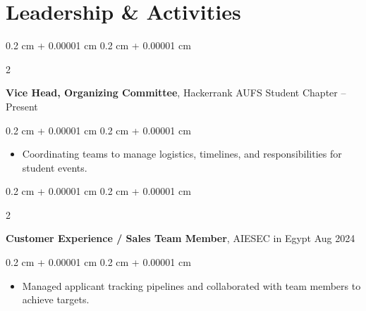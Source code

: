 \documentclass[10pt, letterpaper]{article}
\newenvironment{highlights}{
    \begin{itemize}[
        topsep=0.10 cm,
        parsep=0.10 cm,
        partopsep=0pt,
        itemsep=0pt,
        leftmargin=0.4 cm + 10pt
    ]
}{
    \end{itemize}
} %
\newenvironment{onecolentry}{
    \begin{adjustwidth}{
        0.2 cm + 0.00001 cm
    }{
        0.2 cm + 0.00001 cm
    }
}{
    \end{adjustwidth}
} %
\newenvironment{twocolentry}[2][]{
    \onecolentry
    \def\secondColumn{#2}
    \setcolumnwidth{\fill, 4.5 cm}
    \begin{paracol}{2}
}{
    \switchcolumn \raggedleft \secondColumn
    \end{paracol}
    \endonecolentry
} %
\begin{document}
    \section{Leadership \& Activities}

        \begin{twocolentry}{
            2025 – Present
        }
            \textbf{Vice Head, Organizing Committee}, Hackerrank AUFS Student Chapter\end{twocolentry}
        \vspace{0.10 cm}
        \begin{onecolentry}
            \begin{highlights}
                \item Coordinating teams to manage logistics, timelines, and responsibilities for student events.
            \end{highlights}
        \end{onecolentry}

        \vspace{0.2 cm}

        \begin{twocolentry}{
            Aug 2024
        }
            \textbf{Customer Experience / Sales Team Member}, AIESEC in Egypt\end{twocolentry}
        \vspace{0.10 cm}
        \begin{onecolentry}
            \begin{highlights}
                \item Managed applicant tracking pipelines and collaborated with team members to achieve targets.
            \end{highlights}
        \end{onecolentry}
\end{document}
